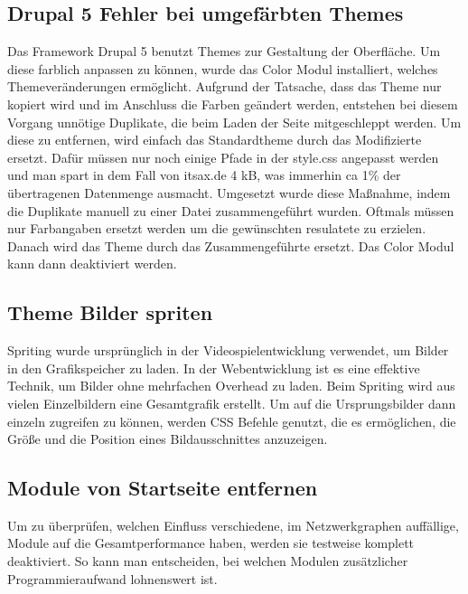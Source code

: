 \subsection{Drupal 5 Fehler bei umgefärbten Themes}
Das Framework Drupal 5 benutzt Themes zur Gestaltung der Oberfläche. Um diese farblich anpassen zu können, wurde das Color Modul installiert, welches Themeveränderungen ermöglicht. Aufgrund der Tatsache, dass das Theme nur kopiert wird und im Anschluss die Farben geändert werden, entstehen bei diesem Vorgang unnötige Duplikate, die beim Laden der Seite mitgeschleppt werden. Um diese zu entfernen, wird einfach das Standardtheme durch das Modifizierte ersetzt. Dafür müssen  nur noch einige Pfade in der style.css angepasst werden und man spart in dem Fall von itsax.de 4 kB, was immerhin ca 1\% der übertragenen Datenmenge ausmacht. Umgesetzt wurde diese Ma\ss{}nahme, indem die Duplikate manuell zu einer Datei zusammengef\"uhrt wurden. Oftmals m\"ussen nur Farbangaben ersetzt werden um die gew\"unschten resulatete zu erzielen. Danach wird das Theme durch das Zusammengef\"uhrte ersetzt. Das Color Modul kann dann deaktiviert werden.

\subsection{Theme Bilder spriten}
Spriting wurde ursprünglich in der Videospielentwicklung verwendet, um Bilder in den Grafikspeicher zu laden. In der Webentwicklung ist es eine effektive Technik, um Bilder ohne mehrfachen Overhead zu laden. Beim Spriting wird aus vielen Einzelbildern eine Gesamtgrafik erstellt. Um auf die Ursprungsbilder dann einzeln zugreifen zu können, werden CSS Befehle genutzt, die es ermöglichen, die Größe und die Position eines Bildausschnittes anzuzeigen. 

\subsection{Module von Startseite entfernen}
Um zu überprüfen, welchen Einfluss verschiedene, im Netzwerkgraphen auffällige, Module auf die Gesamtperformance haben, werden sie testweise komplett deaktiviert. So kann man entscheiden, bei welchen Modulen zusätzlicher Programmieraufwand lohnenswert ist.

